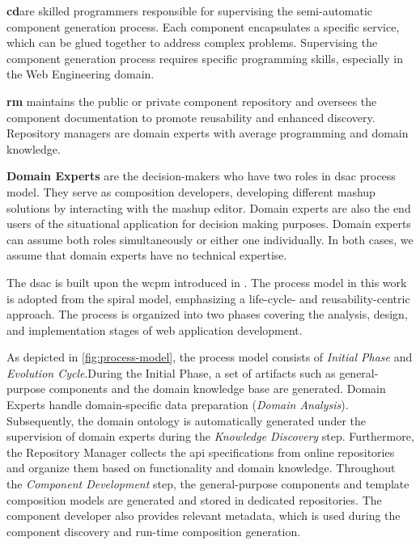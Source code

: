 \textbf{\gls{cd}}are skilled programmers responsible
for supervising the semi-automatic component generation process. Each
component encapsulates a specific service, which can be glued together
to address complex problems. Supervising the component generation
process requires specific programming skills, especially in the Web
Engineering domain.

\textbf{\gls{rm}} maintains the public or private
component repository and oversees the component documentation to promote
reusability and enhanced discovery. Repository managers are domain
experts with average programming and domain knowledge.

\textbf{Domain Experts} are the decision-makers who have two roles in
\gls{dsac} process model. They serve as composition developers, developing
different mashup solutions by interacting with the mashup editor. Domain
experts are also the end users of the situational application for
decision making purposes. Domain experts can assume both roles
simultaneously or either one individually. In both cases, we assume that
domain experts have no technical expertise.

The \gls{dsac} is built upon the ﻿\gls{wcpm}
introduced in \autocite{Gaedke2000}. The process model in this work
is adopted from the spiral model, emphasizing a life-cycle- and
reusability-centric approach. The process is organized into two phases
covering the analysis, design, and implementation stages of web
application development.

As depicted in \cref{fig:process-model}, the process model consists of \emph{Initial
Phase} and \emph{Evolution Cycle}.During the Initial Phase, a
set of artifacts such as general-purpose components and the domain
knowledge base are generated. Domain Experts handle domain-specific data
preparation (\emph{Domain Analysis}). Subsequently, the domain ontology
is automatically generated under the supervision of domain experts
during the \emph{Knowledge Discovery} step. Furthermore, the Repository
Manager collects the \gls{api} specifications from online repositories and
organize them based on functionality and domain knowledge. Throughout
the \emph{Component Development} step, the general-purpose components
and template composition models are generated and stored in dedicated
repositories. The component developer also provides relevant metadata,
which is used during the component discovery and run-time composition
generation.

